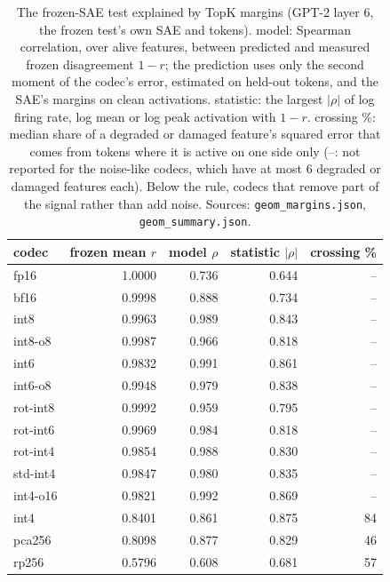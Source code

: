 \begin{table}[htbp]
\caption{The frozen-SAE test explained by TopK margins (GPT-2 layer 6, the frozen test's own SAE and tokens). model: Spearman correlation, over alive features, between predicted and measured frozen disagreement $1-r$; the prediction uses only the second moment of the codec's error, estimated on held-out tokens, and the SAE's margins on clean activations. statistic: the largest $|\rho|$ of log firing rate, log mean or log peak activation with $1-r$. crossing \%: median share of a degraded or damaged feature's squared error that comes from tokens where it is active on one side only (--: not reported for the noise-like codecs, which have at most 6 degraded or damaged features each). Below the rule, codecs that remove part of the signal rather than add noise. Sources: \texttt{geom\_margins.json}, \texttt{geom\_summary.json}.}
\label{tab:margins}
\centering\small
\begin{tabular}{lrrrr}
\toprule
codec & frozen mean $r$ & model $\rho$ & statistic $|\rho|$ & crossing \% \\
\midrule
fp16 & 1.0000 & 0.736 & 0.644 & -- \\
bf16 & 0.9998 & 0.888 & 0.734 & -- \\
int8 & 0.9963 & 0.989 & 0.843 & -- \\
int8-o8 & 0.9987 & 0.966 & 0.818 & -- \\
int6 & 0.9832 & 0.991 & 0.861 & -- \\
int6-o8 & 0.9948 & 0.979 & 0.838 & -- \\
rot-int8 & 0.9992 & 0.959 & 0.795 & -- \\
rot-int6 & 0.9969 & 0.984 & 0.818 & -- \\
rot-int4 & 0.9854 & 0.988 & 0.830 & -- \\
std-int4 & 0.9847 & 0.980 & 0.835 & -- \\
int4-o16 & 0.9821 & 0.992 & 0.869 & -- \\
\midrule
int4 & 0.8401 & 0.861 & 0.875 & 84 \\
pca256 & 0.8098 & 0.877 & 0.829 & 46 \\
rp256 & 0.5796 & 0.608 & 0.681 & 57 \\
\bottomrule
\end{tabular}
\end{table}

